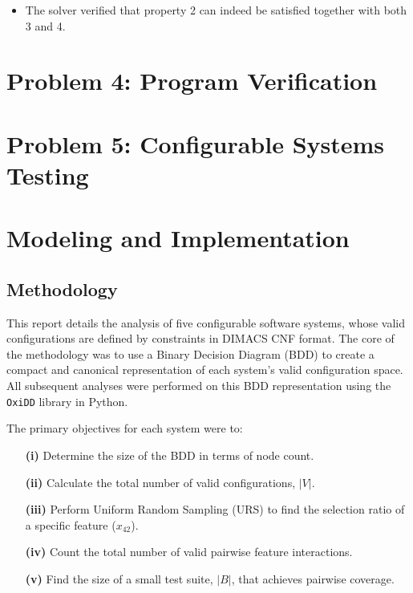 \documentclass{article}
\begin{document}
\begin{itemize}
    \item The solver verified that property 2 can indeed be satisfied together with both 3 and 4.
\end{itemize}

\vspace{1em}
\section*{Problem 4: Program Verification }
\setcounter{section}{0}

\vspace{1em}

\section*{Problem 5: Configurable Systems Testing}
\setcounter{section}{0}

\section{Modeling and Implementation}

\subsection{Methodology}
This report details the analysis of five configurable software systems, whose valid configurations are defined by constraints in DIMACS CNF format. The core of the methodology was to use a Binary Decision Diagram (BDD) to create a compact and canonical representation of each system's valid configuration space. All subsequent analyses were performed on this BDD representation using the \texttt{OxiDD} library in Python.

The primary objectives for each system were to:
\begin{itemize}
    \item[\textbf{(i)}]   Determine the size of the BDD in terms of node count.
    \item[\textbf{(ii)}]  Calculate the total number of valid configurations, $|V|$.
    \item[\textbf{(iii)}] Perform Uniform Random Sampling (URS) to find the selection ratio of a specific feature ($x_{42}$).
    \item[\textbf{(iv)}]  Count the total number of valid pairwise feature interactions.
    \item[\textbf{(v)}]   Find the size of a small test suite, $|B|$, that achieves pairwise coverage.
\end{itemize}
\end{document}

